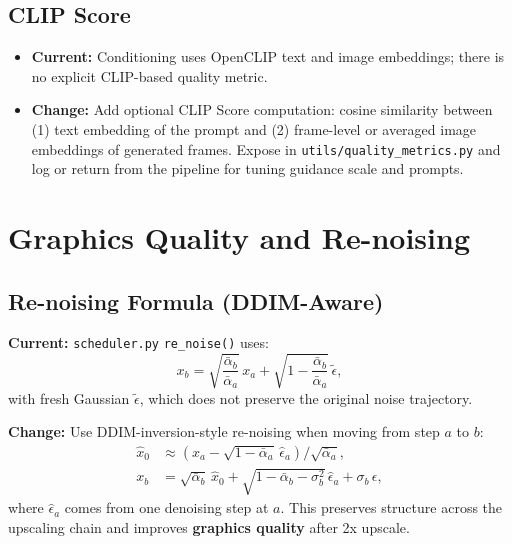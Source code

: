 \documentclass[11pt,a4paper]{article}
\newcommand{\file}[1]{\texttt{#1}}
\newcommand{\fn}[1]{\texttt{#1}}
\begin{document}
\subsection{CLIP Score}

\begin{itemize}
    \item \textbf{Current:} Conditioning uses OpenCLIP text and image embeddings; there is no explicit CLIP-based quality metric.
    \item \textbf{Change:} Add optional CLIP Score computation: cosine similarity between (1) text embedding of the prompt and (2) frame-level or averaged image embeddings of generated frames. Expose in \file{utils/quality\_metrics.py} and log or return from the pipeline for tuning guidance scale and prompts.
\end{itemize}

\section{Graphics Quality and Re-noising}

\subsection{Re-noising Formula (DDIM-Aware)}

\textbf{Current:} \file{scheduler.py} \fn{re\_noise()} uses:
\begin{equation}
x_b = \sqrt{\frac{\bar{\alpha}_b}{\bar{\alpha}_a}}\, x_a + \sqrt{1 - \frac{\bar{\alpha}_b}{\bar{\alpha}_a}}\, \tilde{\epsilon},
\end{equation}
with fresh Gaussian $\tilde{\epsilon}$, which does not preserve the original noise trajectory.

\textbf{Change:} Use DDIM-inversion-style re-noising when moving from step $a$ to $b$:
\begin{align}
\hat{x}_0 &\approx (x_a - \sqrt{1-\bar{\alpha}_a}\,\hat{\epsilon}_a) / \sqrt{\bar{\alpha}_a}, \\
x_b &= \sqrt{\bar{\alpha}_b}\,\hat{x}_0 + \sqrt{1-\bar{\alpha}_b-\sigma_b^2}\,\hat{\epsilon}_a + \sigma_b\,\epsilon,
\end{align}
where $\hat{\epsilon}_a$ comes from one denoising step at $a$. This preserves structure across the upscaling chain and improves \textbf{graphics quality} after 2x upscale.
\end{document}
